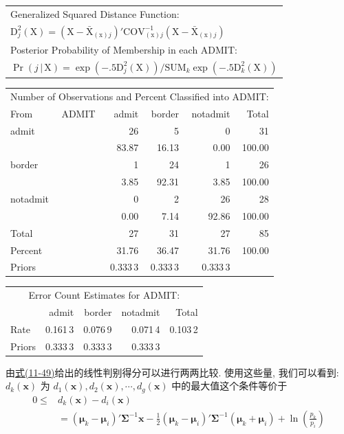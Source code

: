 \begin{mvbox}
{\begin{center}
\begin{tabular}{@{}l@{}}
Generalized Squared Distance Function:\\
$\mathrm{D}_j^2(\mathrm{X})=(\mathrm{X}-\bar{\mathrm{X}}_{(\mathrm{x})j})'\mathrm{COV}_{(\mathrm{x})j}^{-1}(\mathrm{X}-\bar{\mathrm{X}}_{(\mathrm{x})j})$\\
Posterior Probability of Membership in each ADMIT:\\
$\Pr(j\,|\,\mathrm{X})=\exp(-.5\mathrm{D}_j^2(\mathrm{X}))/\mathrm{SUM}_k\exp(-.5\mathrm{D}_k^2(\mathrm{X}))$
\end{tabular}
\end{center}

\begin{center}
\begin{tabular}{@{}llrrrr@{}}
\multicolumn{6}{c}{Number of Observations and Percent Classified into ADMIT:}\\
From & ADMIT & admit & border & notadmit & Total\\
admit & & 26 & 5 & 0 & 31\\
& & 83.87 & 16.13 & 0.00 & 100.00\\
border & & 1 & 24 & 1 & 26\\
& & 3.85 & 92.31 & 3.85 & 100.00\\
notadmit & & 0 & 2 & 26 & 28\\
& & 0.00 & 7.14 & 92.86 & 100.00\\
Total & & 27 & 31 & 27 & 85\\
Percent & & 31.76 & 36.47 & 31.76 & 100.00\\
Priors & & 0.333\,3 & 0.333\,3 & 0.333\,3 &\\
\end{tabular}
\end{center}

\begin{center}
\begin{tabular}{@{}lrrrr@{}}
\multicolumn{5}{c}{Error Count Estimates for ADMIT:}\\
& admit & border & notadmit & Total\\
Rate & 0.161\,3 & 0.076\,9 & 0.071\,4 & 0.103\,2\\
Priors & 0.333\,3 & 0.333\,3 & 0.333\,3 &\\
\end{tabular}
\end{center}
}
\end{mvbox}

由\hyperref[eq:11-49]{式(11-49)}给出的线性判别得分可以进行两两比较. 使用这些量, 我们可以看到: $d_k(\mathbf{x})$ 为 $d_1(\mathbf{x}), d_2(\mathbf{x}),\cdots,d_g(\mathbf{x})$ 中的最大值这个条件等价于
\[
\begin{aligned}
0\le & d_k(\mathbf{x})-d_i(\mathbf{x})\\
&=(\boldsymbol{\mu}_k-\boldsymbol{\mu}_i)'\boldsymbol{\Sigma}^{-1}\mathbf{x}-\frac{1}{2}(\boldsymbol{\mu}_k-\boldsymbol{\mu}_i)'\boldsymbol{\Sigma}^{-1}(\boldsymbol{\mu}_k+\boldsymbol{\mu}_i)+\ln\left(\frac{p_k}{p_i}\right)
\end{aligned}
\]
